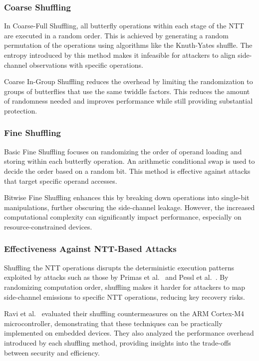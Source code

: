 \subsubsection{Coarse Shuffling}

In Coarse-Full Shuffling, all butterfly operations within each stage of the \ac{NTT} are executed in a random order. This is achieved by generating a random permutation of the operations using algorithms like the Knuth-Yates shuffle. The entropy introduced by this method makes it infeasible for attackers to align side-channel observations with specific operations.

Coarse In-Group Shuffling reduces the overhead by limiting the randomization to groups of butterflies that use the same twiddle factors. This reduces the amount of randomness needed and improves performance while still providing substantial protection.

\subsubsection{Fine Shuffling}

Basic Fine Shuffling focuses on randomizing the order of operand loading and storing within each butterfly operation. An arithmetic conditional swap is used to decide the order based on a random bit. This method is effective against attacks that target specific operand accesses.

Bitwise Fine Shuffling enhances this by breaking down operations into single-bit manipulations, further obscuring the side-channel leakage. However, the increased computational complexity can significantly impact performance, especially on resource-constrained devices.

\subsubsection{Effectiveness Against NTT-Based Attacks}

Shuffling the \ac{NTT} operations disrupts the deterministic execution patterns exploited by attacks such as those by Primas et al.~\cite{Primas17} and Pessl et al.~\cite{Pessl19}. By randomizing computation order, shuffling makes it harder for attackers to map side-channel emissions to specific \ac{NTT} operations, reducing key recovery risks.

Ravi et al.~\cite{Ravi20} evaluated their shuffling countermeasures on the ARM Cortex-M4 microcontroller, demonstrating that these techniques can be practically implemented on embedded devices. They also analyzed the performance overhead introduced by each shuffling method, providing insights into the trade-offs between security and efficiency.